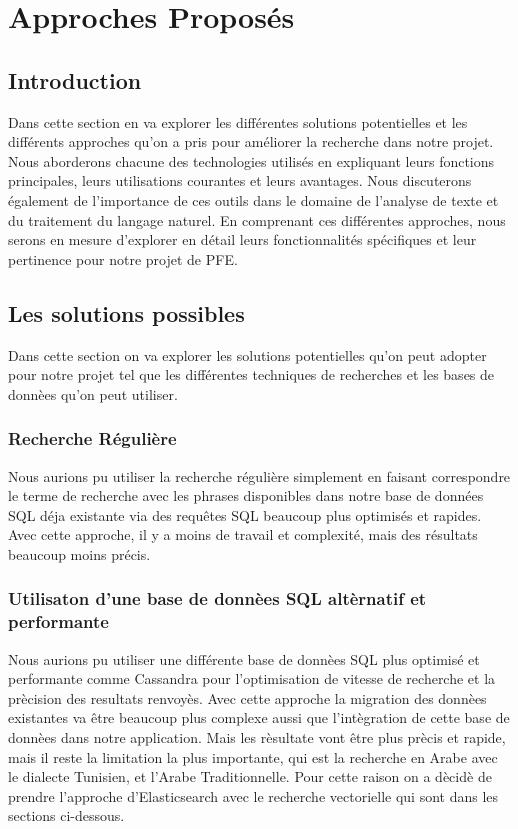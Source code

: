 \chapter{Approches Proposés}
\section{Introduction}
\noindent
Dans cette section en va explorer les différentes solutions potentielles et les différents approches qu'on a pris pour améliorer la recherche dans notre projet. Nous aborderons chacune des technologies utilisés en expliquant leurs fonctions principales, leurs utilisations courantes et leurs avantages. Nous discuterons également de l'importance de ces outils dans le domaine de l'analyse de texte et du traitement du langage naturel. En comprenant ces différentes approches, nous serons en mesure d'explorer en détail leurs fonctionnalités spécifiques et leur pertinence pour notre projet de PFE.

\section{Les solutions possibles}
\noindent
Dans cette section on va explorer les solutions potentielles qu'on peut adopter pour notre projet tel que les différentes techniques de recherches et les bases de donnèes qu'on peut utiliser. 

\subsection{Recherche Régulière}
\noindent
Nous aurions pu utiliser la recherche régulière simplement en faisant correspondre le terme de recherche avec les phrases disponibles dans notre base de données SQL déja existante via des requêtes SQL beaucoup plus optimisés et rapides. Avec cette approche, il y a moins de travail et complexité, mais des résultats beaucoup moins précis.

\subsection{Utilisaton d'une base de donnèes SQL altèrnatif et performante}
\noindent
Nous aurions pu utiliser une différente base de donnèes SQL plus optimisé et performante comme Cassandra pour l'optimisation de vitesse de recherche et la prècision des resultats renvoyès. Avec cette approche la migration des donnèes existantes va être beaucoup plus complexe aussi que l'intègration de cette base de donnèes dans notre application. Mais les rèsultate vont être plus prècis et rapide, mais il reste la limitation la plus importante, qui est la recherche en Arabe avec le dialecte Tunisien, et l'Arabe Traditionnelle. Pour cette raison on a dècidè de prendre l'approche d'Elasticsearch avec le recherche vectorielle qui sont dans les sections ci-dessous.

